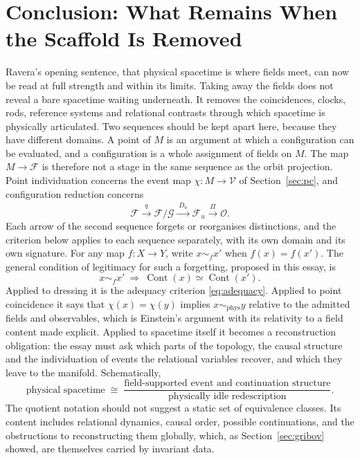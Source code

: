 \documentclass[11pt]{article}
\theoremstyle{plain}
\theoremstyle{definition}
\theoremstyle{remark}
\newcommand{\F}{\mathcal F}
\newcommand{\G}{\mathcal G}
\newcommand{\Cont}{\operatorname{Cont}}
\begin{document}
\section{Conclusion: What Remains When the Scaffold Is Removed}\label{sec:conclusion}

Ravera's opening sentence, that physical spacetime is where fields meet, can now be read at full strength and within its limits. Taking away the fields does not reveal a bare spacetime waiting underneath. It removes the coincidences, clocks, rods, reference systems and relational contrasts through which spacetime is physically articulated. Two sequences should be kept apart here, because they have different domains. A point of $M$ is an argument at which a configuration can be evaluated, and a configuration is a whole assignment of fields on $M$. The map $M\to\F$ is therefore not a stage in the same sequence as the orbit projection. Point individuation concerns the event map $\chi:M\to\mathcal V$ of Section~\ref{sec:pc}, and configuration reduction concerns
\begin{equation}
\F\xrightarrow{\;q\;}\F/\G\xrightarrow{\;\overline D_u\;}\F_u\xrightarrow{\;\Pi\;}\mathcal O .
\end{equation}
Each arrow of the second sequence forgets or reorganises distinctions, and the criterion below applies to each sequence separately, with its own domain and its own signature. For any map $f:X\to Y$, write $x\sim_f x'$ when $f(x)=f(x')$. The general condition of legitimacy for such a forgetting, proposed in this essay, is
\begin{equation}
x\sim_f x'\ \Longrightarrow\ \Cont(x)\simeq\Cont(x').
\end{equation}
Applied to dressing it is the adequacy criterion \eqref{eq:adequacy}. Applied to point coincidence it says that $\chi(x)=\chi(y)$ implies $x\sim_{\mathrm{phys}}y$ relative to the admitted fields and observables, which is Einstein's argument with its relativity to a field content made explicit. Applied to spacetime itself it becomes a reconstruction obligation: the essay must ask which parts of the topology, the causal structure and the individuation of events the relational variables recover, and which they leave to the manifold. Schematically,
\begin{equation}
\text{physical spacetime}\;\cong\;\frac{\text{field-supported event and continuation structure}}{\text{physically idle redescription}}.
\end{equation}
The quotient notation should not suggest a static set of equivalence classes. Its content includes relational dynamics, causal order, possible continuations, and the obstructions to reconstructing them globally, which, as Section~\ref{sec:gribov} showed, are themselves carried by invariant data.
\end{document}
